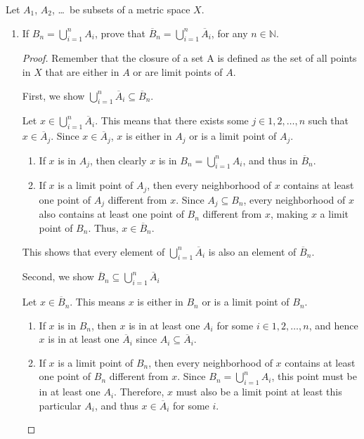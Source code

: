 \documentclass[10pt]{article}
\newenvironment{problem}[2][Problem]{\begin{trivlist}
\item[\hskip \labelsep {\bfseries #1}\hskip \labelsep {\bfseries #2.}]}{\end{trivlist}}
\begin{document}
\newpage
\begin{problem}{3} 
	Let $A_1$, $A_2$, \dots\ be subsets of a metric space $X$.
	
	\begin{enumerate}
		\item If $B_n = \bigcup_{i=1}^n A_i$, prove that $\overline{B}_n = \bigcup_{i=1}^n \overline{A}_i$, for any $n \in {\mathbb N}$.
            \begin{proof}
                Remember that the closure of a set A is defined as the set of all points in $X$ that are either in $A$ or are limit points of $A$. 

                First, we show $\bigcup_{i=1}^n \overline{A}_i \subseteq \overline{B}_n$.

                Let $x \in \bigcup_{i=1}^n \overline{A}_i$.
                This means that there exists some $j \in {1, 2, \dots, n}$ such that $x \in \overline{A}_j$.
                Since $x \in \overline{A}_j$, $x$ is either in $A_j$ or is a limit point of $A_j$.
                \begin{enumerate}
                    \item 
                        If $x$ is in $A_j$, then clearly $x$ is in $B_n = \bigcup_{i=1}^n A_i$, and thus in $\overline{B}_n$.
                    \item
                        If $x$ is a limit point of $A_j$, then every neighborhood of $x$ contains at least one point of $A_j$ different from $x$. Since $A_j \subseteq B_n$, every neighborhood of $x$ also contains at least one point of $B_n$ different from $x$, making $x$ a limit point of $B_n$. Thus, $x \in \overline{B}_n$.
                \end{enumerate}

                This shows that every element of $\bigcup_{i=1}^n \overline{A}_i$ is also an element of $\overline{B}_n$.

                Second, we show $\overline{B}_n \subseteq \bigcup_{i=1}^n \overline{A}_i$

                Let $x \in \overline{B}_n$. This means $x$ is either in $B_n$ or is a limit point of $B_n$.

                \begin{enumerate}
                    \item
                        If $x$ is in $B_n$, then $x$ is in at least one $A_i$ for some $i \in {1, 2, \dots, n}$, and hence $x$ is in at least one $\overline{A}_i$ since $A_i \subseteq \overline{A}_i$.
                    \item
                        If $x$ is a limit point of $B_n$, then every neighborhood of $x$ contains at least one point of $B_n$ different from $x$. Since $B_n = \bigcup_{i=1}^n A_i$, this point must be in at least one $A_i$. Therefore, $x$ must also be a limit point at least this particular $A_i$, and thus $x \in \overline{A}_i$ for some $i$.
                \end{enumerate}


\end{proof}
\end{enumerate}
\end{problem}
\end{document}
